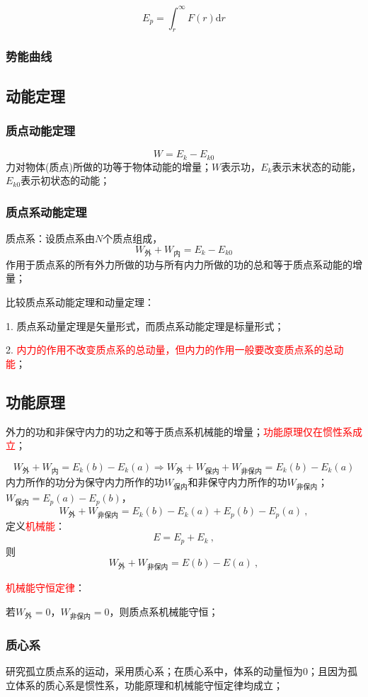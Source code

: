 \documentclass[12pt,a4paper]{article}
\newcommand{\dif}{\mathrm{d}}
\begin{document}
\begin{equation}
E_p = \int_r^{\infty} F(r) \dif r
\end{equation}

\subsubsection{势能曲线}





\subsection{动能定理}
\subsubsection{质点动能定理}
\begin{equation}
W = E_k -E_{k0}
\end{equation}
力对物体(质点)所做的功等于物体动能的增量；$W$表示功，$E_k$表示末状态的动能，$E_{k0}$表示初状态的动能；

\subsubsection{质点系动能定理}
质点系：设质点系由$N$个质点组成，
\begin{equation}
W_{\text{外}} + W_{\text{内}} = E_k -E_{k0}
\end{equation}
作用于质点系的所有外力所做的功与所有内力所做的功的总和等于质点系动能的增量；

比较质点系动能定理和动量定理：

1. 质点系动量定理是矢量形式，而质点系动能定理是标量形式；

2. \textcolor{red}{内力的作用不改变质点系的总动量，但内力的作用一般要改变质点系的总动能}；


\subsection{功能原理}
外力的功和非保守内力的功之和等于质点系机械能的增量；\textcolor{red}{功能原理仅在惯性系成立}；

\begin{equation}
W_{\text{外}} + W_{\text{内}} = E_k(b) -E_{k}(a) \Longrightarrow W_{\text{外}} + W_{\text{保内}} +W_{\text{非保内}} = E_k(b) -E_{k}(a) 
\end{equation}
内力所作的功分为保守内力所作的功$W_{\text{保内}}$和非保守内力所作的功$W_{\text{非保内}}$；$W_{\text{保内}}  = E_p(a) -E_p(b)$，
\begin{equation}
W_{\text{外}} +W_{\text{非保内}} = E_k(b) -E_{k}(a) +E_p(b) -E_p(a) ~,
\end{equation}
定义\textcolor{red}{机械能}：
\begin{equation}
E = E_p +E_k ~,
\end{equation}
则
\begin{equation}
W_{\text{外}} +W_{\text{非保内}} = E(b) -E(a) ~,
\end{equation}

\textcolor{red}{机械能守恒定律}：

若$W_{\text{外}} = 0$，$W_{\text{非保内}} = 0$，则质点系机械能守恒；


\subsubsection{质心系}
研究孤立质点系的运动，采用质心系；在质心系中，体系的动量恒为$0$；且因为孤立体系的质心系是惯性系，功能原理和机械能守恒定律均成立；
\end{document}
